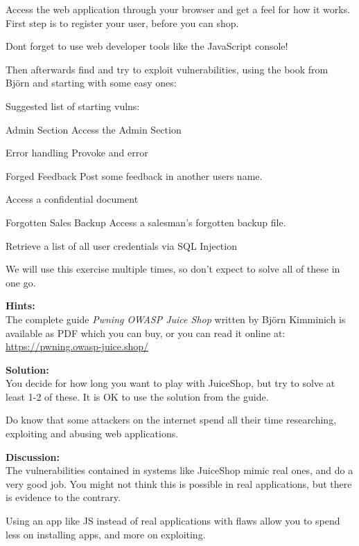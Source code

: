 \documentclass[a4paper,11pt,notitlepage]{report}
\begin{document}
Access the web application through your browser and get a feel for how it works. First step is to register your user, before you can shop.

Dont forget to use web developer tools like the JavaScript console!

Then afterwards find and try to exploit vulnerabilities, using the book from Björn and starting with some easy ones:

Suggested list of starting vulns:
\begin{list2}
\item Admin Section Access the Admin Section
\item Error handling Provoke and error
\item Forged Feedback Post some feedback in another users name.
\item Access a confidential document
\item Forgotten Sales Backup Access a salesman's forgotten backup file.
\item Retrieve a list of all user credentials via SQL Injection
\end{list2}

We will use this exercise multiple times, so don't expect to solve all of these in one go.

{\bf Hints:}\\
The complete guide \emph{Pwning OWASP Juice Shop} written by Björn Kimminich is available as PDF which you can buy, or you can read it online at:\\
\url{https://pwning.owasp-juice.shop/}


 {\bf Solution:}\\
 You decide for how long you want to play with JuiceShop, but try to solve at least 1-2 of these. It is OK to use the solution from the guide.

 Do know that some attackers on the internet spend all their time researching, exploiting and abusing web applications.

 {\bf Discussion:}\\
The vulnerabilities contained in systems like JuiceShop mimic real ones, and do a very good job. You might not think this is possible in real applications, but there is evidence to the contrary.

Using an app like JS instead of real applications with flaws allow you to spend less on installing apps, and more on exploiting.
\end{document}
